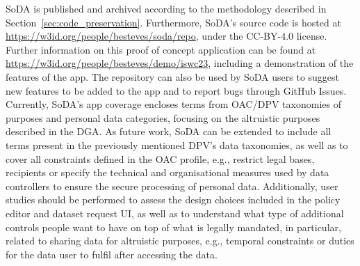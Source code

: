 SoDA is published and archived according to the methodology described in Section~\ref{sec:code_preservation}.
Furthermore, SoDA's source code is hosted at \url{https://w3id.org/people/besteves/soda/repo}, under the CC-BY-4.0 license.
Further information on this proof of concept application can be found at \url{https://w3id.org/people/besteves/demo/iswc23}, including a demonstration of the features of the app.
The repository can also be used by SoDA users to suggest new features to be added to the app and to report bugs through GitHub Issues.
Currently, SoDA's app coverage encloses terms from OAC/DPV taxonomies of purposes and personal data categories, focusing on the altruistic purposes described in the DGA.
As future work, SoDA can be extended to include all terms present in the previously mentioned DPV's data taxonomies, as well as to cover all constraints defined in the OAC profile, e.g., restrict legal bases, recipients or specify the technical and organisational measures used by data controllers to ensure the secure processing of personal data.
Additionally, user studies should be performed to assess the design choices included in the policy editor and dataset request UI, as well as to understand what type of additional controls people want to have on top of what is legally mandated, in particular, related to sharing data for altruistic purposes, e.g., temporal constraints or duties for the data user to fulfil after accessing the data.